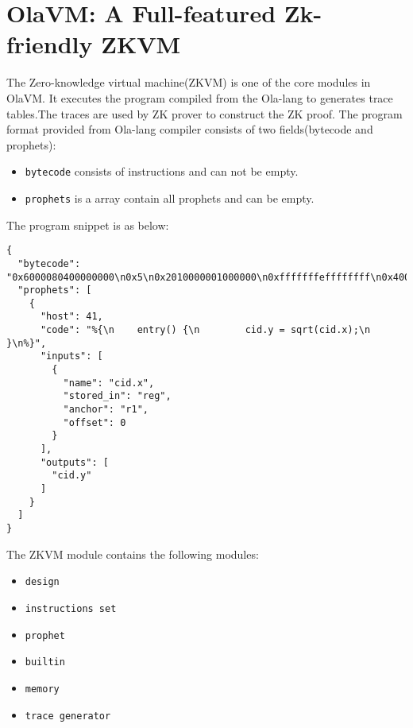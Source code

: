 \section{OlaVM: A Full-featured Zk-friendly ZKVM}\label{sec:ola-vm}
The Zero-knowledge virtual machine(ZKVM) is one of the core modules in OlaVM. It executes the program compiled from the Ola-lang to generates trace tables.The traces are used by ZK prover to construct the ZK proof.
The program format provided from Ola-lang compiler consists of two fields(bytecode and prophets):
\begin{itemize}
    \item \verb|bytecode| consists of instructions and can not be empty.
    \item \verb|prophets| is a array contain all prophets and can be empty.
\end{itemize}

The program snippet is as below:
\begin{lstlisting}[label={lst:program-demo}]
{
  "bytecode": "0x6000080400000000\n0x5\n0x2010000001000000\n0xfffffffeffffffff\n0x4000000840000000\n0x0\n0x0030000001000000\n",
  "prophets": [
    {
      "host": 41,
      "code": "%{\n    entry() {\n        cid.y = sqrt(cid.x);\n    }\n%}",
      "inputs": [
        {
          "name": "cid.x",
          "stored_in": "reg",
          "anchor": "r1",
          "offset": 0
        }
      ],
      "outputs": [
        "cid.y"
      ]
    }
  ]
}
\end{lstlisting}


The ZKVM module contains the following modules:
\begin{itemize}
    \item \verb|design|
    \item \verb|instructions set|
    \item \verb|prophet|
    \item \verb|builtin|
    \item \verb|memory|
    \item \verb|trace generator|
\end{itemize}






